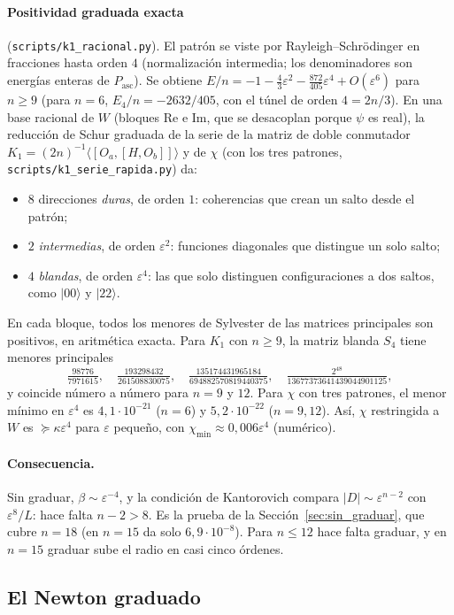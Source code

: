 \documentclass[11pt,a4paper]{article}
\theoremstyle{definition}
\theoremstyle{remark}
\newcommand{\ket}[1]{|#1\rangle}
\newcommand{\ev}[1]{\langle #1\rangle}
\newcommand{\Pasc}{P_{\mathrm{asc}}}
\newcommand{\eps}{\varepsilon}
\newcommand{\scr}[1]{\texttt{scripts/#1}}
\begin{document}
\paragraph{Positividad graduada exacta} (\scr{k1\_racional.py}). El patrón se viste por
Rayleigh--Schrödinger en fracciones hasta orden $4$ (normalización intermedia; los denominadores son
energías enteras de $\Pasc$). Se obtiene $E/n=-1-\frac43\eps^2-\frac{872}{405}\eps^4+O(\eps^6)$ para
$n\ge9$ (para $n=6$, $E_4/n=-2632/405$, con el túnel de orden $4=2n/3$). En una base racional de $W$
(bloques Re e Im, que se desacoplan porque $\psi$ es real), la reducción de Schur graduada de la serie
de la matriz de doble conmutador $K_1=(2n)^{-1}\ev{[O_a,[H,O_b]]}$ y de $\chi$ (con los tres patrones,
\scr{k1\_serie\_rapida.py}) da:
\begin{itemize}
\item $8$ direcciones \emph{duras}, de orden $1$: coherencias que crean un salto desde el patrón;
\item $2$ \emph{intermedias}, de orden $\eps^2$: funciones diagonales que distingue un solo salto;
\item $4$ \emph{blandas}, de orden $\eps^4$: las que solo distinguen configuraciones a dos saltos, como
  $\ket{00}$ y $\ket{22}$.
\end{itemize}
En cada bloque, todos los menores de Sylvester de las matrices principales son positivos, en
aritmética exacta. Para $K_1$ con $n\ge9$, la matriz blanda $S_4$ tiene menores principales
\[
  \tfrac{98776}{7971615},\quad\tfrac{193298432}{261508830075},\quad
  \tfrac{135174431965184}{694882570819440375},\quad\tfrac{2^{48}}{13677373641439044901125},
\]
y coincide número a número para $n=9$ y $12$. Para $\chi$ con tres patrones, el menor mínimo en
$\eps^4$ es $4{,}1\cdot10^{-21}$ ($n=6$) y $5{,}2\cdot10^{-22}$ ($n=9,12$). Así, $\chi$ restringida a
$W$ es $\succeq\kappa\eps^4$ para $\eps$ pequeño, con $\chi_{\min}\approx0{,}006\eps^4$ (numérico).

\paragraph{Consecuencia.} Sin graduar, $\beta\sim\eps^{-4}$, y la condición de Kantorovich compara
$|D|\sim\eps^{n-2}$ con $\eps^8/L$: hace falta $n-2>8$. Es la prueba de la
Sección~\ref{sec:sin_graduar}, que cubre $n=18$ (en $n=15$ da solo $6{,}9\cdot10^{-8}$). Para $n\le12$ hace
falta graduar, y en $n=15$ graduar sube el radio en casi cinco órdenes.

\subsection{El Newton graduado}
\end{document}
